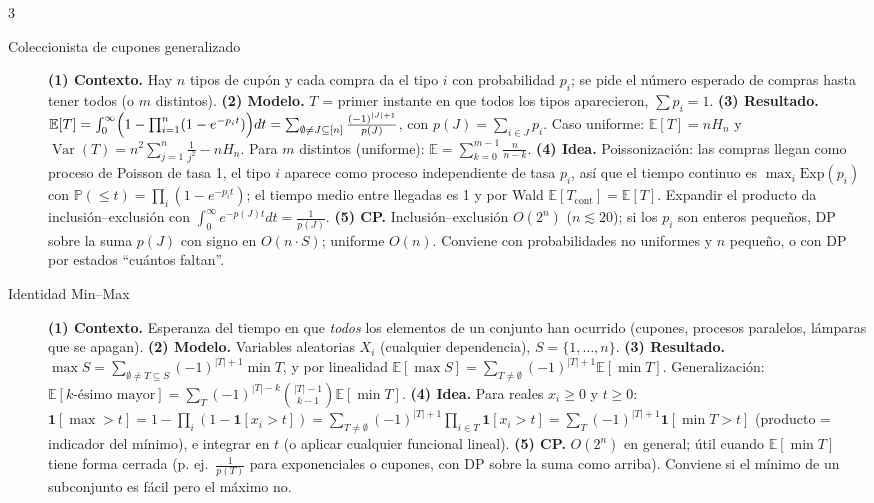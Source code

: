 \documentclass[8pt, spanish, mexico, letterpaper]{extarticle}
\newcommand{\E}{\mathbb{E}}
\newcommand{\Var}{\operatorname{Var}}
\newcommand{\Prob}{\mathbb{P}}
\newcommand{\<}{<}
\begin{document}
\begin{multicols*}{3}
\begin{description}
\item[Coleccionista de cupones generalizado] \textbf{(1) Contexto.} Hay $n$ tipos de cup\'on y cada compra da el tipo $i$ con probabilidad $p_i$; se pide el n\'umero esperado de compras hasta tener todos (o $m$ distintos). \textbf{(2) Modelo.} $T$ = primer instante en que todos los tipos aparecieron, $\sum p_i=1$. \textbf{(3) Resultado.} $\E[T]=\int_0^\infty\Bigl(1-\prod_{i=1}^n(1-e^{-p_it})\Bigr)dt=\sum_{\emptyset\ne J\subseteq[n]}\frac{(-1)^{|J|+1}}{p(J)}$, con $p(J)=\sum_{i\in J}p_i$. Caso uniforme: $\E[T]=nH_n$ y $\Var(T)=n^2\sum_{j=1}^n\frac1{j^2}-nH_n$. Para $m$ distintos (uniforme): $\E=\sum_{k=0}^{m-1}\frac n{n-k}$. \textbf{(4) Idea.} Poissonizaci\'on: las compras llegan como proceso de Poisson de tasa 1, el tipo $i$ aparece como proceso independiente de tasa $p_i$, as\'i que el tiempo continuo es $\max_i\mathrm{Exp}(p_i)$ con $\Prob(\le t)=\prod_i(1 - e^{-p_it})$; el tiempo medio entre llegadas es 1 y por Wald $\E[T_{\text{cont}}]=\E[T]$. Expandir el producto da inclusi\'on--exclusi\'on con $\int_0^\infty e^{-p(J)t}dt=\frac1{p(J)}$. \textbf{(5) CP.} Inclusi\'on--exclusi\'on $O(2^n)$ ($n\lesssim20$); si los $p_i$ son enteros peque\~nos, DP sobre la suma $p(J)$ con signo en $O(n\cdot S)$; uniforme $O(n)$. Conviene con probabilidades no uniformes y $n$ peque\~no, o con DP por estados ``cu\'antos faltan''.

\item[Identidad Min--Max] \textbf{(1) Contexto.} Esperanza del tiempo en que \emph{todos} los elementos de un conjunto han ocurrido (cupones, procesos paralelos, lámparas que se apagan). \textbf{(2) Modelo.} Variables aleatorias $X_i$ (cualquier dependencia), $S=\{1,\dots,n\}$. \textbf{(3) Resultado.} $\max S=\sum_{\emptyset\ne T\subseteq S}(-1)^{|T|+1}\min T$, y por linealidad $\E[\max S]=\sum_{T\ne\emptyset}(-1)^{|T|+1}\E[\min T]$. Generalizaci\'on: $\E[k\text{-\'esimo mayor}]=\sum_{T}(-1)^{|T|-k}\binom{|T|-1}{k-1}\E[\min T]$. \textbf{(4) Idea.} Para reales $x_i\ge0$ y $t\ge0$: $\mathbf 1[\max>t]=1-\prod_i(1-\mathbf 1[x_i>t])=\sum_{T\ne\emptyset}(-1)^{|T|+1}\prod_{i\in T}\mathbf 1[x_i>t]=\sum_T(-1)^{|T|+1}\mathbf 1[\min T>t]$ (producto = indicador del m\'inimo), e integrar en $t$ (o aplicar cualquier funcional lineal). \textbf{(5) CP.} $O(2^n)$ en general; \'util cuando $\E[\min T]$ tiene forma cerrada (p. ej.\ $\frac1{p(T)}$ para exponenciales o cupones, con DP sobre la suma como arriba). Conviene si el m\'inimo de un subconjunto es f\'acil pero el m\'aximo no.


\end{description}
\end{multicols*}
\end{document}
